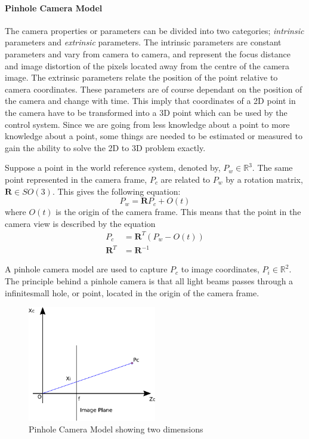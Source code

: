 \paragraph{Pinhole Camera Model}
	The camera properties or parameters can be divided into two categories; \textit{intrinsic} parameters and
	\textit{extrinsic} parameters. The intrinsic parameters are constant parameters and vary from camera to
	camera, and represent the focus distance and image distortion of the pixels located away from the centre of the
	camera image. 
	The extrinsic parameters relate the position of the point relative to camera coordinates. 
	These parameters are of course dependant on the position of the camera and change with time. 	This imply that 
	coordinates of a 2D point in the camera have to be transformed into a 3D point which can be used 
	by the control system. Since 
	we are going from less knowledge about a point to more knowledge about a point, some things are needed to be 
	estimated or measured to gain the ability to solve the 2D to 3D problem exactly.\cite{robotbok}

	Suppose a point in the world reference system, denoted by, $P_w \in \mathbb{R}^3$. The same point
	represented in the camera frame, $P_c$ are related to $P_w$ by a rotation matrix, $\mathbf{R} \in
	SO(3)$. This gives the following equation: 
	\begin{equation}
		P_w = \mathbf{R} P_c + O(t)
	\end{equation}
	where $O(t)$ is the origin of the camera frame. This means that the point in the camera view is
	described by the equation
	\begin{equation}
		\label{eq:ch1-P_c}
        \begin{aligned}
		P_c &= \mathbf{R}^T (P_w - O(t)) \\
		\mathbf{R}^T &= \mathbf{R}^{-1} 
        \end{aligned}
	\end{equation}

	A pinhole camera model are used to capture $P_c$ to image coordinates, $P_i \in
	\mathbb{R}^2$. 
	The principle behind a pinhole camera is that all light beams passes through a
	infinitesmall hole, or point, located in the origin of the camera frame.   
	\begin{figure}[hbtp]
		\centering
		\includegraphics[width=0.5\textwidth]{pics/pinhole_model}
		\caption{Pinhole Camera Model showing two dimensions}
		\label{fig:ch2-pinhole}
	\end{figure}
			
